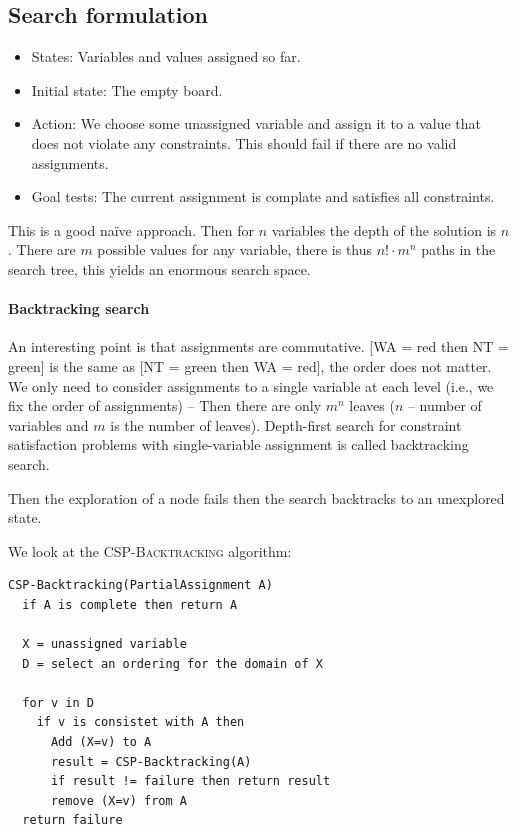 \documentclass{article}
\begin{document}
\subsection{Search formulation}%
\label{sub:search_formulation}

\begin{itemize}
  \item States: 
    \subitem Variables and values assigned so far.
  \item Initial state: 
    \subitem The empty board.
  \item Action: 
    \subitem We choose some unassigned variable and assign it to a value that
    does not violate any constraints. This should fail if there are no valid
    assignments.
  \item Goal tests:
    \subitem The current assignment is complate and satisfies all constraints.
\end{itemize}

This is a good naïve approach. Then for $n$ variables the depth of the solution
is $n$. There are $m$ possible values for any variable, there is thus $n! \cdot
m^n$ paths in the search tree, this yields an enormous search space.

\paragraph{Backtracking search}%
\label{par:backtracking_search}

An interesting point is that assignments are commutative. [WA = red then NT =
green] is the same as [NT = green then WA = red], the order does not matter.  We
only need to consider assignments to a single variable at each level (i.e., we
fix the order of assignments) – Then there are only $m^n$ leaves ($n$ – number
of variables and $m$ is the number of leaves).
Depth-first search for constraint satisfaction problems with single-variable
assignment is called backtracking search.

Then the exploration of a node fails then the search backtracks to an unexplored
state.

We look at the \textsc{CSP-Backtracking} algorithm:
\begin{lstlisting}[inputencoding=utf8/latin1,basicstyle=\small, keywordstyle=\color{blue}\bfseries, rulecolor=\color{black}]
CSP-Backtracking(PartialAssignment A)
  if A is complete then return A
  
  X = unassigned variable
  D = select an ordering for the domain of X
  
  for v in D
    if v is consistet with A then 
      Add (X=v) to A 
      result = CSP-Backtracking(A)
      if result != failure then return result 
      remove (X=v) from A
  return failure
  
\end{lstlisting}
\end{document}
